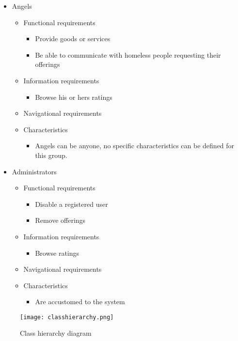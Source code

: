 \documentclass[a4paper]{report}
\begin{document}
\begin{itemize}
\item Angels
\begin{itemize}
\item Functional requirements
\begin{itemize}
	\item Provide goods or services
	\item Be able to communicate with homeless people requesting their offerings
\end{itemize}
\item Information requirements
\begin{itemize}
	\item Browse his or hers ratings
\end{itemize}
\item Navigational requirements
\item Characteristics
\begin{itemize}
	\item Angels can be anyone, no specific characteristics can be defined for this group.
\end{itemize}
\end{itemize}

\item Administrators
\begin{itemize}
\item Functional requirements
\begin{itemize}
	\item Disable a registered user
	\item Remove offerings
\end{itemize}
\item Information requirements
\begin{itemize}
	\item Browse ratings
\end{itemize}
\item Navigational requirements
\item Characteristics
\begin{itemize}
	\item Are accustomed to the system
\end{itemize}
\end{itemize}

\end{itemize}

\begin{figure}[htp]
\centering
\texttt{[image: classhierarchy.png]}
\caption{Class hierarchy diagram}
\label{fig:classhierarchy}
\end{figure}



\chapter{}


\chapter{}
\end{document}
